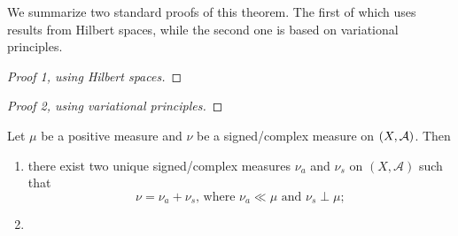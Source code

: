 We summarize two standard proofs of this theorem. The first of which uses results from Hilbert spaces, while the second one is based on variational principles.
\begin{proof}[Proof 1, using Hilbert spaces]
    
\end{proof}
\begin{proof}[Proof 2, using variational principles]
    
\end{proof}

\begin{namedthm}\label{thm:Leb-decomp}
     Let $\mu$ be a positive measure and $\nu$ be a signed/complex measure on $(X,\mathcal{A})$. Then 
     \begin{enumerate}
         \item \label{enu:decomp} there exist two unique signed/complex measures $\nu_a$ and $\nu_s$ on $(X,\mathcal{A})$ such that \[
            \nu = \nu_{a} + \nu_{s}\text{, where }\nu_a \ll \mu \text{ and } \nu_s \perp \mu;
         \]
         \item \label{enu:derivative} %
     \end{enumerate}
\end{namedthm}

